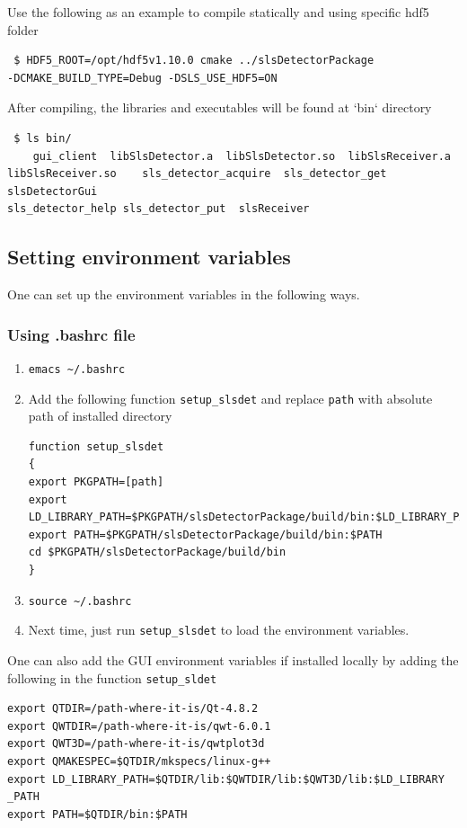 \documentclass{article}
\begin{document}
Use the following as an example to compile statically and using specific hdf5
folder 
\begin{verbatim}
 $ HDF5_ROOT=/opt/hdf5v1.10.0 cmake ../slsDetectorPackage
-DCMAKE_BUILD_TYPE=Debug -DSLS_USE_HDF5=ON
\end{verbatim}

After compiling, the libraries and executables will be found at `bin` directory 
\begin{verbatim}
 $ ls bin/
    gui_client  libSlsDetector.a  libSlsDetector.so  libSlsReceiver.a 
libSlsReceiver.so    sls_detector_acquire  sls_detector_get  slsDetectorGui 
sls_detector_help sls_detector_put  slsReceiver
\end{verbatim}




\subsection{Setting environment variables}
One can set up the environment variables in the following ways.

\subsubsection{Using .bashrc file}
\begin{enumerate}
 \item \verb=emacs ~/.bashrc=
 \item Add the following function \verb=setup_slsdet= and replace \verb=path=
with absolute path of installed directory
\begin{verbatim}
function setup_slsdet
{ 
export PKGPATH=[path]
export LD_LIBRARY_PATH=$PKGPATH/slsDetectorPackage/build/bin:$LD_LIBRARY_PATH
export PATH=$PKGPATH/slsDetectorPackage/build/bin:$PATH
cd $PKGPATH/slsDetectorPackage/build/bin
} 
\end{verbatim}
  \item \verb=source ~/.bashrc=
  \item Next time, just run \verb=setup_slsdet= to load the environment
variables.
\end{enumerate}


One can also add the GUI environment variables if installed locally by adding
the following in the function \verb=setup_sldet= \\
\begin{verbatim}
export QTDIR=/path-where-it-is/Qt-4.8.2
export QWTDIR=/path-where-it-is/qwt-6.0.1
export QWT3D=/path-where-it-is/qwtplot3d
export QMAKESPEC=$QTDIR/mkspecs/linux-g++
export LD_LIBRARY_PATH=$QTDIR/lib:$QWTDIR/lib:$QWT3D/lib:$LD_LIBRARY _PATH
export PATH=$QTDIR/bin:$PATH
\end{verbatim}
\end{document}
